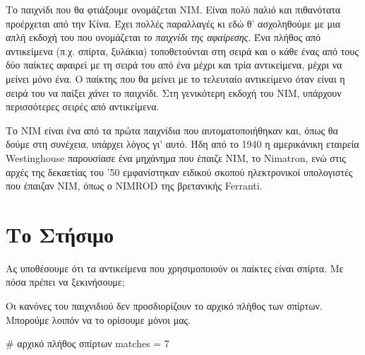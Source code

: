 \documentclass[a4paper,11pt,oneside]{book}
\begin{document}

\vspace{-12pt}%
Το παιχνίδι που θα φτιάξουμε ονομάζεται ΝΙΜ. Είναι πολύ παλιό και πιθανότατα προέρχεται από την Κίνα. Έχει πολλές παραλλαγές κι εδώ θ' ασχοληθούμε με μια απλή εκδοχή του που ονομάζεται \emph{το παιχνίδι της αφαίρεσης}. Ένα πλήθος από αντικείμενα (π.χ. σπίρτα, ξυλάκια) τοποθετούνται στη σειρά και ο κάθε ένας από τους δύο παίκτες αφαιρεί με τη σειρά του από ένα μέχρι και τρία αντικείμενα, μέχρι να μείνει μόνο ένα. Ο παίκτης που θα μείνει με το τελευταίο αντικείμενο όταν είναι η σειρά του να παίξει \emph{χάνει} το παιχνίδι. Στη γενικότερη εκδοχή του ΝΙΜ, υπάρχουν περισσότερες σειρές από αντικείμενα.

Το ΝΙΜ είναι ένα από τα πρώτα παιχνίδια που αυτοματοποιήθηκαν και, όπως θα δούμε στη συνέχεια, υπάρχει λόγος γι' αυτό. Ήδη από το 1940 η αμερικάνικη εταιρεία Westinghouse παρουσίασε ένα μηχάνημα που έπαιζε ΝΙΜ, το Nimatron, ενώ στις αρχές της δεκαετίας του '50 εμφανίστηκαν ειδικού σκοπού ηλεκτρονικοί υπολογιστές που έπαιζαν ΝΙΜ, όπως ο NIMROD της βρετανικής Ferranti.


\section{Το Στήσιμο}

\begin{question}
Ας υποθέσουμε ότι τα αντικείμενα που χρησιμοποιούν οι παίκτες είναι σπίρτα. Με πόσα πρέπει να ξεκινήσουμε;
\end{question}

Οι κανόνες του παιχνιδιού δεν προσδιορίζουν το αρχικό πλήθος των σπίρτων. Μπορούμε λοιπόν να το ορίσουμε μόνοι μας.

\begin{pycode}
# αρχικό πλήθος σπίρτων
matches = 7
\end{pycode}
\end{document}
